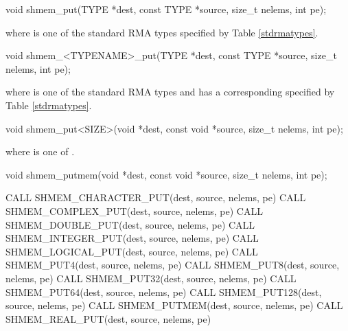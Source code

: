 
\begin{apidefinition}

\begin{C11synopsis}
void shmem_put(TYPE *dest, const TYPE *source, size_t nelems, int pe);
\end{C11synopsis}
where \TYPE{} is one of the standard \ac{RMA} types specified by Table \ref{stdrmatypes}.

\begin{Csynopsis}
void shmem_<TYPENAME>_put(TYPE *dest, const TYPE *source, size_t nelems, int pe);
\end{Csynopsis}
where \TYPE{} is one of the standard \ac{RMA} types and has a corresponding \TYPENAME{} specified by Table \ref{stdrmatypes}.

\begin{CsynopsisCol}
void shmem_put<SIZE>(void *dest, const void *source, size_t nelems, int pe);
\end{CsynopsisCol}
where \SIZE{} is one of .

\begin{CsynopsisCol}
void shmem_putmem(void *dest, const void *source, size_t nelems, int pe);
\end{CsynopsisCol}

\begin{Fsynopsis}
CALL SHMEM_CHARACTER_PUT(dest, source, nelems, pe)
CALL SHMEM_COMPLEX_PUT(dest, source, nelems, pe)
CALL SHMEM_DOUBLE_PUT(dest, source, nelems, pe)
CALL SHMEM_INTEGER_PUT(dest, source, nelems, pe)
CALL SHMEM_LOGICAL_PUT(dest, source, nelems, pe)
CALL SHMEM_PUT4(dest, source, nelems, pe)
CALL SHMEM_PUT8(dest, source, nelems, pe)
CALL SHMEM_PUT32(dest, source, nelems, pe)
CALL SHMEM_PUT64(dest, source, nelems, pe)
CALL SHMEM_PUT128(dest, source, nelems, pe)
CALL SHMEM_PUTMEM(dest, source, nelems, pe)
CALL SHMEM_REAL_PUT(dest, source, nelems, pe)
\end{Fsynopsis}

\begin{apiarguments}
\end{apiarguments}


\end{apidefinition}
